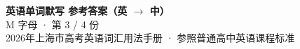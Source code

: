 \documentclass[10pt,a4paper]{article}
\begin{document}
\pagestyle{plain}

\begin{center}
{\LARGE\bfseries 英语单词默写 \quad 参考答案（英 $\to$ 中）}\\[0.22em]
{\large M 字母 · 第 3 / 4 份}\\[0.18em]
{\small 2026年上海市高考英语词汇用法手册 · 参照普通高中英语课程标准}
\end{center}

\vspace{0.2em}
\noindent{\color{rulegray}\rule{\textwidth}{0.8pt}}

\vspace{0.35em}

\vspace{0.25em}
\renewcommand{\arraystretch}{1.32}
\end{document}
